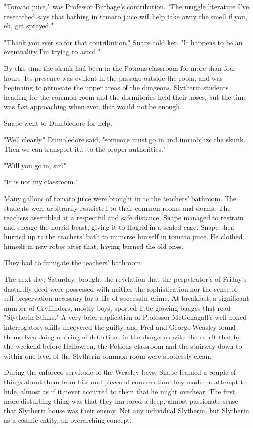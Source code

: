 \documentclass[a4paper,11pt]{article}
\begin{document}
"Tomato juice," was Professor Burbage's contribution. "The muggle literature I've researched says that bathing in tomato juice will help take away the smell if you, eh, get sprayed."

"Thank you ever so for that contribution," Snape told her. "It happens to be an eventuality I'm trying to avoid."

By this time the skunk had been in the Potions classroom for more than four hours. Its presence was evident in the passage outside the room, and was beginning to permeate the upper areas of the dungeons. Slytherin students heading for the common room and the dormitories held their noses, but the time was fast approaching when even that would not be enough.

Snape went to Dumbledore for help.

"Well clearly," Dumbledore said, "someone must go in and immobilize the skunk. Then we can transport it... to the proper authorities."

"Will you go in, sir?"

"It is not my classroom."

Many gallons of tomato juice were brought in to the teachers' bathroom. The students were arbitrarily restricted to their common rooms and dorms. The teachers assembled at a respectful and safe distance. Snape managed to restrain and encage the horrid beast, giving it to Hagrid in a sealed cage. Snape then hurried up to the teachers' bath to immerse himself in tomato juice. He clothed himself in new robes after that, having burned the old ones.

They had to fumigate the teachers' bathroom.

The next day, Saturday, brought the revelation that the perpetrator's of Friday's dastardly deed were possessed with neither the sophistication nor the sense of self-preservation necessary for a life of successful crime. At breakfast, a significant number of Gryffindors, mostly boys, sported little glowing badges that read "Slytherin Stinks." A very brief application of Professor McGonagall's well-honed interrogatory skills uncovered the guilty, and Fred and George Weasley found themselves doing a string of detentions in the dungeons with the result that by the weekend before Halloween, the Potions classroom and the stairway down to within one level of the Slytherin common room were spotlessly clean.

During the enforced servitude of the Weasley boys, Snape learned a couple of things about them from bits and pieces of conversation they made no attempt to hide, almost as if it never occurred to them that he might overhear. The first, more disturbing thing was that they harbored a deep, almost passionate sense that Slytherin house was their enemy. Not any individual Slytherin, but Slytherin as a cosmic entity, an overarching concept.
\end{document}
